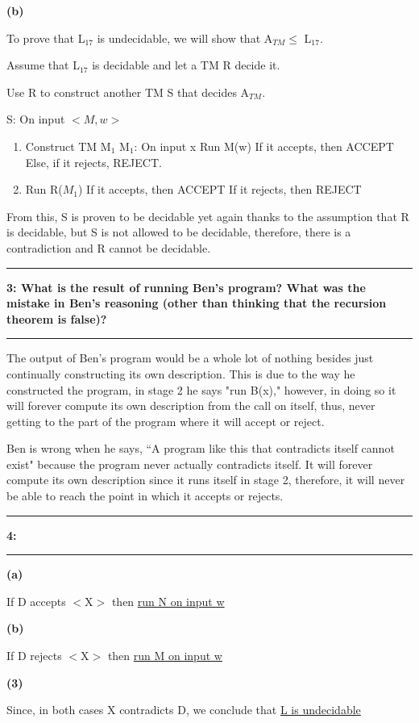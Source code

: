 \documentclass[11pt]{article}
\newcommand\question[2]{\vspace{.25in}\hrule\textbf{#1: #2}\vspace{.5em}\hrule\vspace{.10in}}
\renewcommand\part[1]{\vspace{.10in}\textbf{(#1)}\par}
\begin{document}
	\part{b}
		To prove that L$_{17}$ is undecidable, we will show that A$_{TM} \le$ L$_{17}$.\par
		Assume that L$_{17}$ is decidable and let a TM R decide it.\par
		Use R to construct another TM S that decides A$_{TM}$.\par
		\quad S: On input $<M, w>$\par
			\begin{enumerate}
				\item Construct TM M$_{1}$
					\subitem M$_{1}$: On input x
						\subsubitem Run M(w)
						\subsubitem If it accepts, then ACCEPT
						\subsubitem \quad Else, if it rejects, REJECT.
				\item Run R($M_{1}$)
					\subitem If it accepts, then ACCEPT
					\subitem If it rejects, then REJECT
			\end{enumerate}\par
		From this, S is proven to be decidable yet again thanks to the assumption that R is decidable, but S is not allowed to be decidable, therefore, there is a contradiction and R cannot be decidable.\par
		
\question{3}{What is the result of running Ben’s program? What was the mistake in Ben’s reasoning (other than thinking that the recursion theorem is false)?}
	The output of Ben's program would be a whole lot of nothing besides just continually constructing its own description. This is due to the way he constructed the program, in stage 2 he says "run B(x)," however, in doing so it will forever compute its own description from the call on itself, thus, never getting to the part of the program where it will accept or reject.\par
	Ben is wrong when he says, “A program like this that contradicts itself cannot exist" because the program never actually contradicts itself. It will forever compute its own description since it runs itself in stage 2, therefore, it will never be able to reach the point in which it accepts or rejects.\par
	
\question{4}{}
	\part{a}
		If D accepts $<$X$>$ then \underline{run N on input w}\par
		
	\part{b}
		If D rejects $<$X$>$ then \underline{run M on input w}\par
	
	\part{3}
		Since, in both cases X contradicts D, we conclude that \underline{L is undecidable}\par
	
\end{document}
